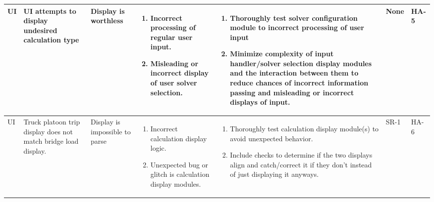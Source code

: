 \documentclass{article}
\begin{document}
\begin{landscape}
\begin{longtable}{|p{} | p{} | p{} | p{} | p{} | p{} | p{}|}
  UI & UI attempts to display undesired calculation type& Display is worthless & 
  \begin{enumerate}[leftmargin=*, label={\alph*.}, itemsep=1pt, topsep=0pt, partopsep=0pt] 
    \item Incorrect processing of regular user input.
    \item Misleading or incorrect display of user solver selection.
  \end{enumerate} &
  \begin{enumerate}[leftmargin=*, label={\alph*.}, itemsep=1pt, topsep=0pt, partopsep=0pt] 
    \item Thoroughly test solver configuration module to incorrect processing of user input
    \item Minimize complexity of input handler/solver selection display modules and the interaction between them to reduce chances of incorrect information passing
    and misleading or incorrect displays of input.
  \end{enumerate} &
  None & HA-5 \\

  \hline

  UI & Truck platoon trip display does not match bridge load display. &
  Display is impossible to parse &
  \begin{enumerate}[leftmargin=*, label={\alph*.}, itemsep=1pt, topsep=0pt, partopsep=0pt] 
    \item Incorrect calculation display logic.
    \item Unexpected bug or glitch is calculation display modules.
  \end{enumerate} &
  \begin{enumerate}[leftmargin=*, label={\alph*.}, itemsep=1pt, topsep=0pt, partopsep=0pt] 
    \item Thoroughly test calculation display module(s) to avoid unexpected behavior.
    \item Include checks to determine if the two displays align and catch/correct it if they don’t instead of just displaying it anyways.
  \end{enumerate} &
  SR-1 & HA-6 \\

  \hline


\end{longtable}
\end{landscape}
\end{document}
